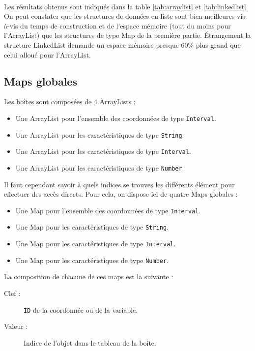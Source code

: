 \paragraph{}Les résultats obtenus sont indiqués dans la table \ref{tab:arraylist} et \ref{tab:linkedlist}
On peut constater que les structures de données en liste sont bien meilleures vis-à-vis du temps de construction et de l'espace mémoire (tout du moins pour l'ArrayList) que les structures de type Map de la première partie. Étrangement la structure LinkedList demande un espace mémoire presque 60\% plus grand que celui alloué pour l'ArrayList.


\subsection{Maps globales}
Les boîtes sont composées  de 4 ArrayLists : 
\begin{itemize}
  \item Une ArrayList pour l'ensemble des coordonnées de type \verb+Interval+.
  \item Une ArrayList pour les caractéristiques de type \verb+String+.
  \item Une ArrayList pour les caractéristiques de type \verb+Interval+.
  \item Une ArrayList pour les caractéristiques de type \verb+Number+.
\end{itemize}
Il faut cependant savoir à quels indices se trouves les différents élément pour effectuer des accès directs. Pour cela, on dispose ici de quatre Maps globales :
\begin{itemize}
  \item Une Map pour l'ensemble des coordonnées de type \verb+Interval+.
  \item Une Map pour les caractéristiques de type \verb+String+.
  \item Une Map pour les caractéristiques de type \verb+Interval+.
  \item Une Map pour les caractéristiques de type \verb+Number+.
\end{itemize}
La composition de chacune de ces maps est la suivante :  
\begin{description}
 \item[Clef :]
\verb+ID+ de la coordonnée ou de la variable.
\item[Valeur :]
Indice de l'objet dans le tableau de la boîte.
\end{description}


